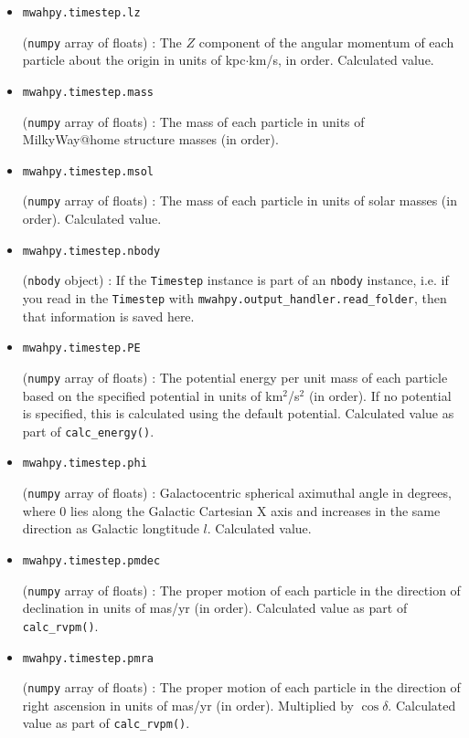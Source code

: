 \documentclass{article}
\begin{document}
\begin{itemize}
\item \verb!mwahpy.timestep.lz!

(\verb!numpy! array of floats) : The $Z$ component of the angular momentum of each particle about the origin in units of kpc$\cdot$km/s, in order. Calculated value.

\item \verb!mwahpy.timestep.mass!

(\verb!numpy! array of floats) : The mass of each particle in units of MilkyWay@home structure masses (in order). 

\item \verb!mwahpy.timestep.msol!

(\verb!numpy! array of floats) : The mass of each particle in units of solar masses (in order). Calculated value.

\item \verb!mwahpy.timestep.nbody!

(\verb!nbody! object) : If the \verb!Timestep! instance is part of an \verb!nbody! instance, i.e. if you read in the \verb!Timestep! with \verb!mwahpy.output_handler.read_folder!, then that information is saved here. 

\item \verb!mwahpy.timestep.PE!

(\verb!numpy! array of floats) : The potential energy per unit mass of each particle based on the specified potential in units of km$^2$/s$^2$ (in order). If no potential is specified, this is calculated using the default \mwahpy potential. Calculated value as part of \verb!calc_energy()!.

\item \verb!mwahpy.timestep.phi!

(\verb!numpy! array of floats) : Galactocentric spherical aximuthal angle in degrees, where 0 lies along the Galactic Cartesian X axis and increases in the same direction as Galactic longtitude $l$. Calculated value.

\item \verb!mwahpy.timestep.pmdec!

(\verb!numpy! array of floats) : The proper motion of each particle in the direction of declination in units of mas/yr (in order). Calculated value as part of \verb!calc_rvpm()!.

\item \verb!mwahpy.timestep.pmra!

(\verb!numpy! array of floats) : The proper motion of each particle in the direction of right ascension in units of mas/yr (in order). Multiplied by $\cos\delta.$ Calculated value as part of \verb!calc_rvpm()!.


\end{itemize}
\end{document}
